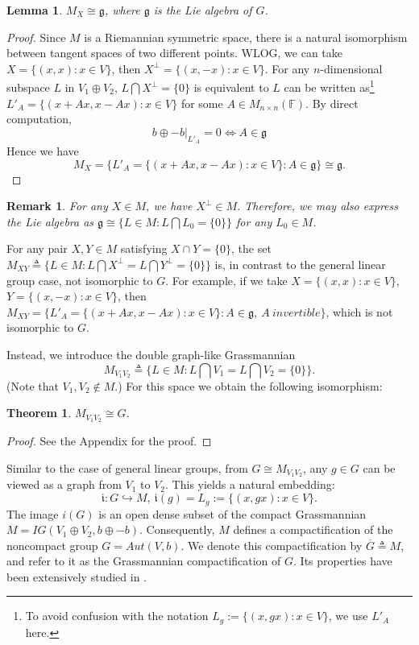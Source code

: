 \documentclass{article}
\newtheorem{thm}{Theorem}[section]
\newtheorem{lem}{Lemma}[section]
\newtheorem{rmk}{Remark}[section]
\begin{document}
\begin{lem}
$M_{X} \cong \mathfrak{g}$, where $\mathfrak{g}$ is the Lie algebra of $G$.
\end{lem}
\begin{proof}
Since $M$ is a Riemannian symmetric space, there is a natural isomorphism between tangent spaces of two different points.
WLOG, we can take $X=\{(x,x): x \in V\}$, then $X^\perp=\{(x,-x): x \in V\}$. For any $n$-dimensional subspace $L$ in $V_1 \oplus V_2$,
$ L \bigcap X^\perp=\{0\}$ is equivalent to $L$ can be written as\footnote{To avoid confusion with the notation $L_g:=\{(x, gx): x \in V\}$, we use $L'_A$ here.} $L'_A=\{(x+Ax,x-Ax): x \in V\}$ for some $A \in M_{n \times n}(\mathbb{F})$.
By direct computation,
\[
b\oplus-b|_{L'_A}=0 \Longleftrightarrow A \in \mathfrak{g}
\]
Hence we have
\[
M_{X}=\{L'_A=\{(x+Ax,x-Ax): x \in V\}:  A \in \mathfrak{g} \} \cong \mathfrak{g}.
\]
\end{proof}

\begin{rmk}
For any $X \in M$, we have $X^\perp \in M$. Therefore, we may also express the Lie algebra as $\mathfrak{g} \cong \{L \in M: L \bigcap L_0=\{0\}\}$ for any $L_0 \in M$.
\end{rmk}


\bigskip
For any pair $X, Y \in M$ satisfying  $X \cap Y=\{0\}$, the set $M_{XY} \triangleq \{L \in M: L \bigcap X^\perp=L \bigcap Y^\perp=\{0\}\}$
is, in contrast to the general linear group case, not isomorphic to $G$. For example, if we take  $X=\{(x,x): x \in V\}$, $Y=\{(x,-x): x \in V\}$, then
$M_{XY}=\{L'_A=\{(x+Ax,x-Ax): x \in V\}:  A \in \mathfrak{g}, ~ A ~ invertible \}$,
which is not isomorphic to $G$.


Instead, we introduce the double graph-like Grassmannian
\[
M_{V_1V_2} \triangleq \{L \in M: L \bigcap V_1=L \bigcap V_2=\{0\}\}.
\]
(Note that $V_1, V_2 \notin M$.) For this space we obtain the following isomorphism:


\begin{thm}
$M_{V_1V_2} \cong G$.
\end{thm}
\begin{proof}
See the Appendix for the proof.
\end{proof}


Similar to the case of general linear groups, from $G \cong M_{V_1V_2}$, any $g \in G$ can be viewed as a graph from $V_1$ to $V_2$. This yields a natural embedding:
\[
\mathfrak{i}: G \hookrightarrow M, ~  \mathfrak{i}(g)= L_g:=\{(x, gx): x \in V\}.
\]
The image $i(G)$ is an open dense subset of the compact Grassmannian $M=IG(V_1 \oplus V_2, b\oplus-b)$.  Consequently,
$M$ defines a compactification of the noncompact group  $G=Aut(V,b)$. We denote this compactification by $\overline{G} \triangleq M$, and refer to it as the Grassmannian compactification of $G$. Its properties have been extensively studied in \cite{FL}\cite{GGKW}\cite{He}.
\end{document}
